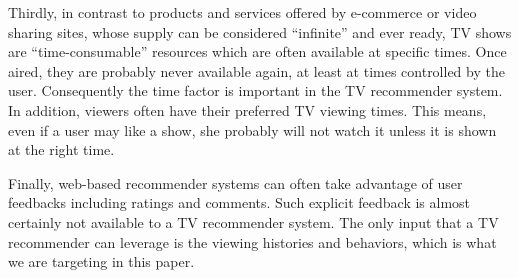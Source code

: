 Thirdly, in contrast to products and services offered by e-commerce
or video sharing sites, whose supply can be considered ``infinite''
and ever ready, TV shows are ``time-consumable'' resources which
are often available at specific times. Once aired, they are probably
never available again, at least at times controlled by the user.
Consequently the time factor is important in the TV recommender system.
In addition, viewers often have their preferred TV viewing times.
This means, even if a user may like a show, she probably will not
watch it unless it is shown at the right time.

Finally, web-based recommender systems can often take
advantage of user feedbacks including ratings and
comments. Such explicit feedback is almost certainly
not available to a TV recommender system. The only
input that a TV recommender can leverage is the viewing histories
and behaviors, which is what we are targeting in this
paper.


